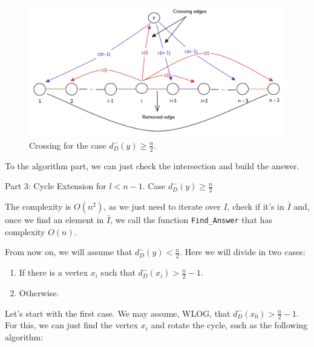 \begin{figure}[H]
    \centering
    \includegraphics[width=1\textwidth]{figuras/cycle_n-1_crossing_1.png}
    \caption{Crossing for the case $d^-_D(y) \geq \frac{n}{2}$.}
    \label{fig:crossing_case_2}
\end{figure}

To the algorithm part, we can just check the intersection and build the answer.

\begin{algorithm}[H]
    \caption{Part 3: Cycle Extension for \( l < n - 1 \). Case \( d^-_D(y) \geq \frac{n}{2} \)}
    \begin{algorithmic}[1]
                    \State \Return {}
                \EndIf
            \EndFor
        \EndFunction
    \end{algorithmic}
\end{algorithm}

The complexity is $O(n^2)$, as we just need to iterate over $I$, check if it's in $\bar{I}$ and, once we find an element in $\bar{I}$, 
we call the function \texttt{Find\_Answer} that has complexity $O(n)$.

From now on, we will assume that $d^-_D(y) < \frac{n}{2}$. Here we will divide in two cases:

\begin{enumerate}
    \item If there is a vertex $x_i$ such that $d^-_D(x_i) > \frac{n}{2} - 1$.
    \item Otherwise.
\end{enumerate}

Let's start with the first case. We may assume, WLOG, that $d^-_D(x_0) > \frac{n}{2} - 1$.
For this, we can just find the vertex $x_i$ and rotate the cycle, such as the following algorithm:

